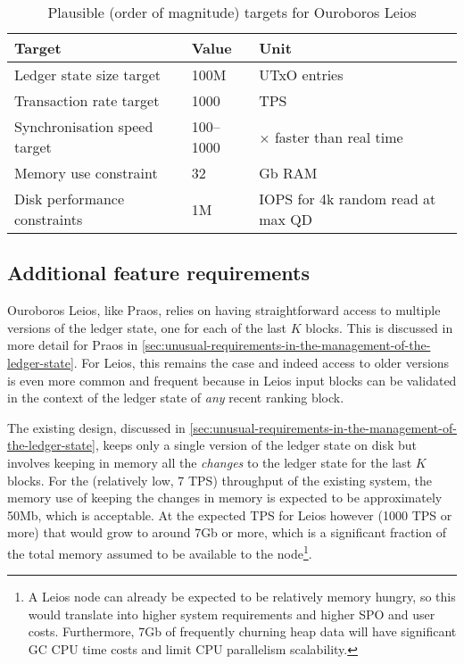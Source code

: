 \documentclass[11pt,a4paper]{article}
\begin{document}
\begin{table}[t]
\centering
\begin{tabular}[]{lll}
  Target & Value & Unit \\
  \toprule
  Ledger state size target     & 100M & UTxO entries \\
  Transaction rate target      & 1000 & TPS \\
  Synchronisation speed target & 100--1000 & $\times$ faster than real time \\
  Memory use constraint        & 32 & Gb RAM \\
  Disk performance constraints & 1M & IOPS for 4k random read at max QD
\end{tabular}
\caption{Plausible (order of magnitude) targets for Ouroboros Leios}
\label{table:leios-requirements}
\end{table}

\subsection{Additional feature requirements}

Ouroboros Leios, like Praos, relies on having straightforward access to
multiple versions of the ledger state, one for each of the last $K$ blocks. This
is discussed in more detail for Praos in
\cref{sec:unusual-requirements-in-the-management-of-the-ledger-state}.
For Leios, this remains the case and indeed access to older versions is even
more common and frequent because in Leios input blocks can be validated in the
context of the ledger state of \emph{any} recent ranking block.

The existing design, discussed in
\cref{sec:unusual-requirements-in-the-management-of-the-ledger-state}, keeps
only a single version of the ledger state on disk but involves keeping in
memory all the \emph{changes} to the ledger state for the last $K$ blocks.
For the (relatively low, 7 TPS) throughput of the existing system, the memory
use of keeping the changes in memory is expected to be approximately 50Mb,
which is acceptable. At the expected TPS for Leios however (1000 TPS or more)
that would grow to around 7Gb or more, which is a significant fraction of the
total memory assumed to be available to the node\footnote{A Leios node can
already be expected to be relatively memory hungry, so this would translate
into higher system requirements and higher SPO and user costs. Furthermore,
7Gb of frequently churning heap data will have significant GC CPU time costs
and limit CPU parallelism scalability.}.
\end{document}
